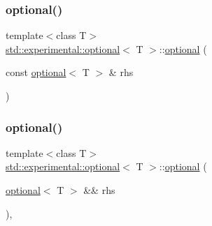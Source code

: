 \mbox{\label{classstd_1_1experimental_1_1optional_a08324fd562beb2f0a43b242596b47b2b}} 
\subsubsection{\texorpdfstring{optional()}{optional()}\hspace{0.1cm}{\footnotesize\ttfamily [3/8]}}
{\footnotesize\ttfamily template$<$class T$>$ \\
\mbox{\hyperlink{classstd_1_1experimental_1_1optional}{std\+::experimental\+::optional}}$<$ T $>$\+::\mbox{\hyperlink{classstd_1_1experimental_1_1optional}{optional}} (\begin{DoxyParamCaption}\item[{const \mbox{\hyperlink{classstd_1_1experimental_1_1optional}{optional}}$<$ T $>$ \&}]{rhs }\end{DoxyParamCaption})\hspace{0.3cm}{\ttfamily [inline]}}

\mbox{\label{classstd_1_1experimental_1_1optional_aef3982e3d2d30c05d3d80ede551fda76}} 
\subsubsection{\texorpdfstring{optional()}{optional()}\hspace{0.1cm}{\footnotesize\ttfamily [4/8]}}
{\footnotesize\ttfamily template$<$class T$>$ \\
\mbox{\hyperlink{classstd_1_1experimental_1_1optional}{std\+::experimental\+::optional}}$<$ T $>$\+::\mbox{\hyperlink{classstd_1_1experimental_1_1optional}{optional}} (\begin{DoxyParamCaption}\item[{\mbox{\hyperlink{classstd_1_1experimental_1_1optional}{optional}}$<$ T $>$ \&\&}]{rhs }\end{DoxyParamCaption})\hspace{0.3cm}{\ttfamily [inline]}, {\ttfamily [noexcept]}}

